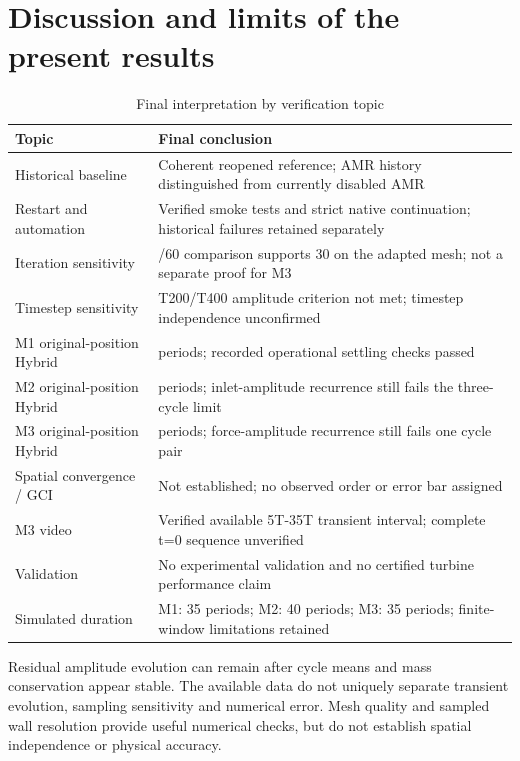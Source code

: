 \documentclass[11pt,a4paper]{article}
\begin{document}
\section{Discussion and limits of the present results}
\par
\begin{table}[!htbp]
\centering
\caption{Final interpretation by verification topic}
\label{tab:16}
\small\renewcommand{\arraystretch}{1.16}
\begin{tabularx}{\linewidth}{@{}>{\raggedright\arraybackslash}X >{\raggedright\arraybackslash}X@{}}
\toprule
\textbf{Topic} & \textbf{Final conclusion} \\
\midrule
Historical baseline & Coherent reopened reference; AMR history distinguished from currently disabled AMR \\
Restart and automation & Verified smoke tests and strict native continuation; historical failures retained separately \\
Iteration sensitivity & 30/60 comparison supports 30 on the adapted mesh; not a separate proof for M3 \\
Timestep sensitivity & T200/T400 amplitude criterion not met; timestep independence unconfirmed \\
M1 original-position Hybrid & 35 periods; recorded operational settling checks passed \\
M2 original-position Hybrid & 40 periods; inlet-amplitude recurrence still fails the three-cycle limit \\
M3 original-position Hybrid & 35 periods; force-amplitude recurrence still fails one cycle pair \\
Spatial convergence / GCI & Not established; no observed order or error bar assigned \\
M3 video & Verified available 5T-35T transient interval; complete t=0 sequence unverified \\
Validation & No experimental validation and no certified turbine performance claim \\
Simulated duration & M1: 35 periods; M2: 40 periods; M3: 35 periods; finite-window limitations retained \\
\bottomrule
\end{tabularx}
\end{table}
\par
Residual amplitude evolution can remain after cycle means and mass conservation appear stable. The available data do not uniquely separate transient evolution, sampling sensitivity and numerical error. Mesh quality and sampled wall resolution provide useful numerical checks, but do not establish spatial independence or physical accuracy.\par
\end{document}
